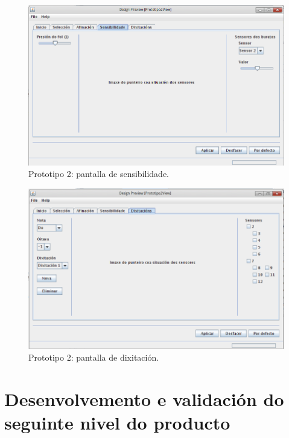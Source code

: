  \begin{figure}[htbp]
  \centering
  \includegraphics[scale=0.6,keepaspectratio=true]{./imagenes/prototipo2_04.png}
  \caption{Prototipo 2: pantalla de sensibilidade.}
  \label{figura:Prototipo2Sensibilidade}
 \end{figure}

 \begin{figure}[htbp]
  \centering
  \includegraphics[scale=0.6,keepaspectratio=true]{./imagenes/prototipo2_05.png}
  \caption{Prototipo 2: pantalla de dixitación.}
  \label{figura:Prototipo2Dixitacion}
 \end{figure}

\section{Desenvolvemento e validación do seguinte nivel do producto}

